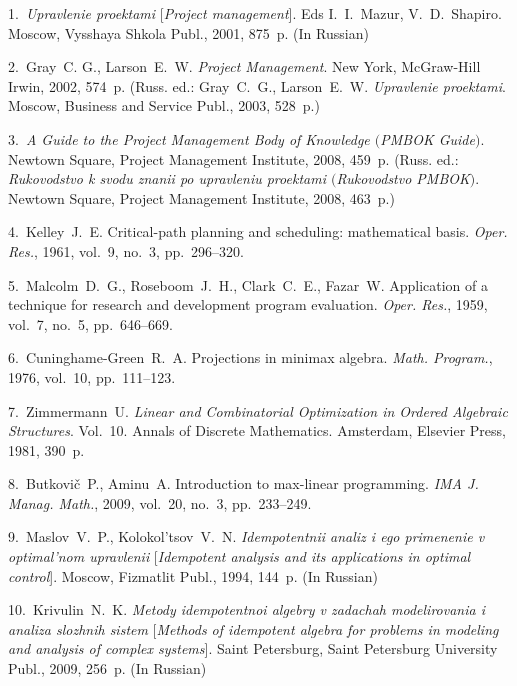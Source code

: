 


{\footnotesize

\vskip 3mm


\vskip 2mm


1.~\textit{Upravlenie proektami} [\textit{Project management}].
Eds I.~I.~Mazur, V.~D.~Shapiro. Moscow, Vysshaya Shkola Publ.,
2001, 875~p. (In Russian)

2.~Gray~C. G., Larson~E.~W. \textit{Project Management}. New York,
McGraw-Hill Irwin, 2002, 574~p. (Russ. ed.: Gray~C.~G.,
Larson~E.~W. {\it Upravlenie proektami}. Moscow, Business and
Service Publ., 2003, 528~p.)

3.~\textit{A Guide to the Project Management Body of Knowledge
$($PMBOK Guide$)$}. Newtown Square, Project Management Institute,
2008, 459~p. (Russ. ed.: {\it Rukovodstvo k svodu znanii po
upravleniu proektami $($Rukovodstvo PMBOK$)$}. Newtown Square,
Project Management Institute, 2008, 463~p.)

4.~Kelley~J.~E. Critical-path planning and scheduling:
mathematical basis. \textit{Oper. Res.}, 1961, vol.~9, no.~3,
pp.~296--320.

5.~Malcolm~D.~G., Roseboom~J.~H., Clark~C.~E., Fazar~W.
Application of a technique for research and development program
evaluation. \textit{Oper. Res.}, 1959, vol.~7, no.~5,
pp.~646--669.

6.~Cuninghame-Green~R.~A. Projections in minimax algebra.
\textit{Math. Program.}, 1976, vol.~10, pp.~111--123.

7.~Zimmermann~U. {\it Linear and Combinatorial Optimization in
Ordered Algebraic Structures}. Vol.~10. Annals of Discrete
Mathematics. Amsterdam, Elsevier Press, 1981, 390~p.

8.~Butkovi\v{c}~P., Aminu~A. Introduction to max-linear
programming. \textit{IMA J. Manag. Math.}, 2009, vol.~20, no.~3,
pp.~233--249.

9.~Maslov~V.~P., Kolokol'tsov~V.~N. \textit{Idempotentnii analiz i
ego primenenie v optimal'nom upravlenii} [\textit{Idempotent
analysis and its applications in optimal control}]. Moscow,
Fizmatlit Publ., 1994, 144~p. (In Russian)

10.~Krivulin~N.~K. \textit{Metody idempotentnoi algebry v zadachah
modelirovania i analiza slozhnih sistem} [\textit{Methods of
idempotent algebra for problems in modeling and analysis of
complex systems}]. Saint Petersburg, Saint Petersburg University
Publ., 2009, 256~p.  (In Russian)

}
